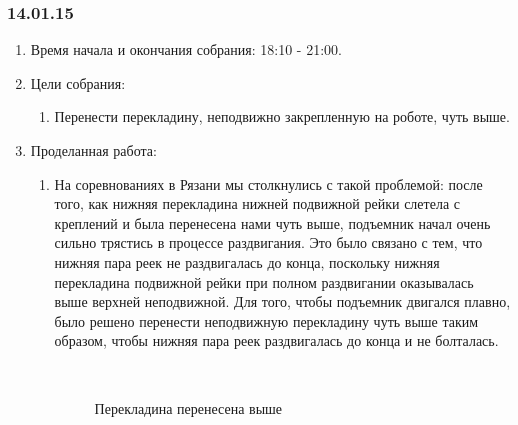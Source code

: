\subsubsection{14.01.15}
\begin{enumerate}
	
	\item Время начала и окончания собрания: 18:10 - 21:00.
	
	\item Цели собрания: 
	\begin{enumerate}
		
		\item Перенести перекладину, неподвижно закрепленную на роботе, чуть выше.
		
	\end{enumerate}

	\item Проделанная работа:
	\begin{enumerate}
		
		\item На соревнованиях в Рязани мы столкнулись с такой проблемой: после того, как нижняя перекладина нижней подвижной рейки слетела с креплений и была перенесена нами чуть выше, подъемник начал очень сильно трястись в процессе раздвигания. Это было связано с тем, что нижняя пара реек не раздвигалась до конца, поскольку нижняя перекладина подвижной рейки при полном раздвигании оказывалась выше верхней неподвижной. Для того, чтобы подъемник двигался плавно, было решено перенести неподвижную перекладину чуть выше таким образом, чтобы нижняя пара реек раздвигалась до конца и не болталась.
        \begin{figure}[H]
	  	  \begin{minipage}[h]{0.2\linewidth}
	  	    \center  
	  	  \end{minipage}
	  	  \begin{minipage}[h]{0.6\linewidth}
	  		\caption{Перекладина перенесена выше}
	  	  \end{minipage}
	   \end{figure}


\end{enumerate}
\end{enumerate}
